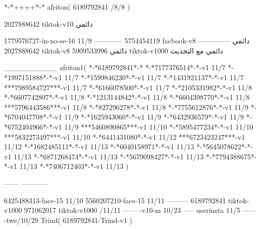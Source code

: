 *-*++++*-*
afriton(
6189792841 /8/8
)

2027888642 tiktok-v10
دائمي

1779576727-in-no-se-16 11/9
------------
5754454119 facbook-v8
دائمي
--------------
2027888642 tiktok-v8
دائمي
5909533996 tiktok-v1000
دائمي مع التحديث

__________
afriton1(
*-*6189792841*-*
*-*7177376514*-*-v1 11/7
*-*1997151888*-*-v1 11/7
*-*1599846230*-*-v1 11/7
*-*1431921137*-*-v1 11/7
***7989584727***-v1 11/7
*-*6166078500*-*-v1 11/7
*-*2105331982*-*-v1 11/8
*-*6607742807*-*-v1 11/8
*-*1213144842*-*-v1 11/8
*-*6604398770*-*-v1 11/8
***5796443586***-v1 11/8
*-*827296278*-*-v1 11/8
*-*7755612876*-*-v1 11/9
*-*6704047708*-*-v1 11/9
*-*1625943060*-*-v1 11/9
*-*6432936579*-*-v1 11/9
*-*6752404966*-*-v1 11/9
***5460890865***-v1 11/10
*-*5895477234*-*-v1 11/10
***5832273497***-v1 11/10
*-*6441431080*-*-v1 11/12
***6723423247***-v1 11/12
*-*1682485111*-*-v1 11/13
*-*6040158971*-*-v1 11/13
*-*5645078622*-*-v1 11/13
*-*6871268474*-*-v1 11/13
*-*5679098427*-*-v1 11/13
*-*7794388675*-*-v1 11/13
*-*7406712403*-*-v1 11/13
)

------
------------

6425488313-face-15 11/10
5560207210-face-15 11/11
---------
6189792841 tiktok-v1000
971062017 tiktok-v1000 /11/11
------
-v10-m 10/23
-----
userinsta 11/5
------
-twe/10/29
Trind(
6189792841-Trind-v1 
)
